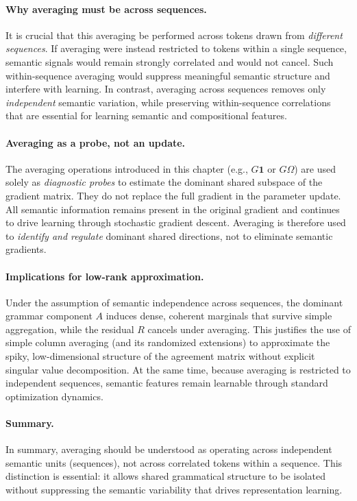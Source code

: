 \paragraph{Why averaging must be across sequences.}
It is crucial that this averaging be performed across tokens drawn from
\emph{different sequences}.
If averaging were instead restricted to tokens within a single sequence, semantic
signals would remain strongly correlated and would not cancel.
Such within-sequence averaging would suppress meaningful semantic structure and
interfere with learning.
In contrast, averaging across sequences removes only \emph{independent} semantic
variation, while preserving within-sequence correlations that are essential for
learning semantic and compositional features.

\paragraph{Averaging as a probe, not an update.}
The averaging operations introduced in this chapter (e.g., $G\mathbf{1}$ or
$G\Omega$) are used solely as \emph{diagnostic probes} to estimate the dominant
shared subspace of the gradient matrix.
They do not replace the full gradient in the parameter update.
All semantic information remains present in the original gradient and continues
to drive learning through stochastic gradient descent.
Averaging is therefore used to \emph{identify and regulate} dominant shared
directions, not to eliminate semantic gradients.

\paragraph{Implications for low-rank approximation.}
Under the assumption of semantic independence across sequences, the dominant
grammar component $A$ induces dense, coherent marginals that survive simple
aggregation, while the residual $R$ cancels under averaging.
This justifies the use of simple column averaging (and its randomized extensions)
to approximate the spiky, low-dimensional structure of the agreement matrix
without explicit singular value decomposition.
At the same time, because averaging is restricted to independent sequences,
semantic features remain learnable through standard optimization dynamics.

\paragraph{Summary.}
In summary, averaging should be understood as operating across independent
semantic units (sequences), not across correlated tokens within a sequence.
This distinction is essential: it allows shared grammatical structure to be
isolated without suppressing the semantic variability that drives representation
learning.